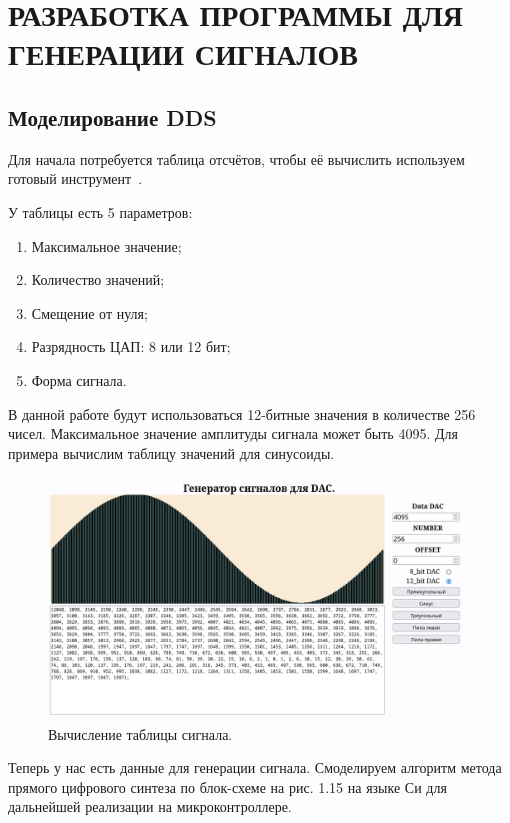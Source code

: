 \chapter{РАЗРАБОТКА ПРОГРАММЫ ДЛЯ ГЕНЕРАЦИИ СИГНАЛОВ}
\section{Моделирование DDS}
	Для начала потребуется таблица отсчётов, чтобы её вычислить используем готовый инструмент~\cite{lut}.
	
	
	У таблицы есть 5 параметров:
	\begin{enumerate}
		\item Максимальное значение;
		\item Количество значений;
		\item Смещение от нуля;
		\item Разрядность ЦАП: 8 или 12 бит;
		\item Форма сигнала.
	\end{enumerate}
	
	В данной работе будут использоваться 12-битные значения в количестве 256 чисел. Максимальное значение амплитуды сигнала может быть 4095. Для примера вычислим таблицу значений для синусоиды.
	
	\begin{figure}[H]
    \centering
    \includegraphics[width=1\textwidth]{../image/lut.png}
    \caption{Вычисление таблицы сигнала.}
	\end{figure}
	
	Теперь у нас есть данные для генерации сигнала. Смоделируем алгоритм метода прямого цифрового синтеза по блок-схеме на рис. 1.15 на языке Си для дальнейшей реализации на микроконтроллере.

